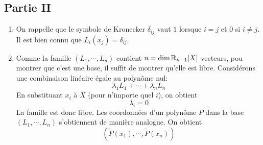 \subsection*{Partie II}
\begin{enumerate}
\item On rappelle que le symbole de Kronecker $\delta_{ij}$ vaut $1$ lorsque $i=j$ et $0$ si $i\neq j$. Il est bien connu que $L_i(x_j)=\delta_{ij}$.
\item Comme la famille $(L_1,\cdots,L_n)$ contient $n=\dim \mathbb{R}_{n-1}[X]$ vecteurs, pou montrer que c'est une base, il suffit de montrer qu'elle est libre. Considérons une combinaison linéaire égale au polynôme nul:
\begin{displaymath}
 \lambda_1L_1 +\cdots +\lambda_n L_n
\end{displaymath}
En substituant $x_i$ à $X$ (pour n'importe quel $i$), on obtient
\begin{displaymath}
 \lambda_i = 0
\end{displaymath}
La famille est donc libre.\newline
Les coordonnées d'un polynôme $P$ dans la base $(L_1,\cdots,L_n)$ s'obtiennent de manière analogue. On obtient
\begin{displaymath}
 (\widetilde{P}(x_1),\cdots,\widetilde{P}(x_n))
\end{displaymath}


\end{enumerate}

